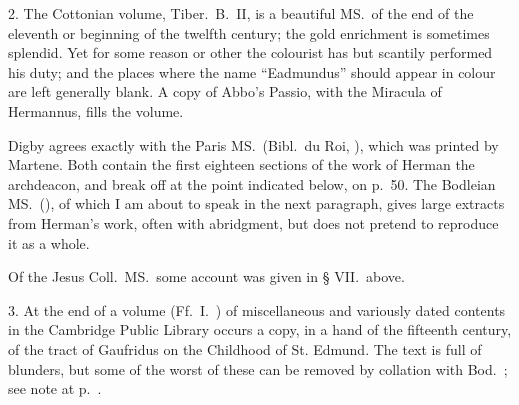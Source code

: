 \documentclass[10pt]{book}
\begin{document}
{2. The Cottonian volume, Tiber.\ B.\ II, is a beautiful MS.\ of the end of the eleventh or beginning of the twelfth century; the gold enrichment is sometimes splendid. Yet for some reason or other the colourist has but scantily performed his duty; and the places where the name ``Eadmundus'' should appear in colour are left generally blank. A copy of Abbo's Passio, with the Miracula of Hermannus, fills the volume.

Digby  agrees exactly with the Paris MS.\ (Bibl.\ du Roi, ), which was printed by Martene. Both contain the first eighteen sections of the work of Herman the archdeacon, and break off at the point indicated below, on p.\ 50. The Bodleian MS.\ (), of which I am about to speak in the next paragraph, gives large extracts from Herman's work, often with abridgment, but does not pretend to reproduce it as a whole.

Of the Jesus Coll.\ MS.\ some account was given in § VII.\ above.

3. At the end of a volume (Ff.\ I.\ ) of miscellaneous and variously dated contents in the Cambridge Public Library occurs a copy, in a hand of the fifteenth century, of the tract of Gaufridus on the Childhood of St. Edmund. The text is full of blunders, but some of the worst of these can be removed by collation with Bod.\ ; see note at p.\ .

}
\end{document}

